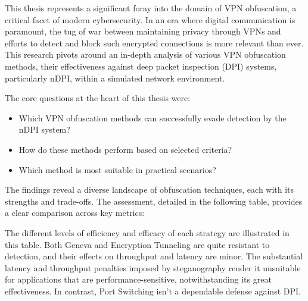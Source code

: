 \documentclass[12pt, fleqn, a4paper]{article}
\begin{document}
This thesis represents a significant foray into the domain of VPN obfuscation, a critical facet of modern cybersecurity. In an era where digital communication is paramount, the tug of war between maintaining privacy through VPNs and efforts to detect and block such encrypted connections is more relevant than ever. This research pivots around an in-depth analysis of various VPN obfuscation methods, their effectiveness against deep packet inspection (DPI) systems, particularly nDPI, within a simulated network environment.

The core questions at the heart of this thesis were:
\begin{itemize}
  \item Which VPN obfuscation methods can successfully evade detection by the nDPI system?
  \item How do these methods perform based on selected criteria?
  \item Which method is most suitable in practical scenarios?
\end{itemize}

The findings reveal a diverse landscape of obfuscation techniques, each with its strengths and trade-offs. The assessment, detailed in the following table, provides a clear comparison across key metrics:

\begin{table}[h]
\centering
\caption{Comparison of VPN Obfuscation Methods}
\label{table:vpn_obfuscation_methods}
\end{table}

The different levels of efficiency and efficacy of each strategy are illustrated in this table. Both Geneva and Encryption Tunneling are quite resistant to detection, and their effects on throughput and latency are minor. The substantial latency and throughput penalties imposed by steganography render it unsuitable for applications that are performance-sensitive, notwithstanding its great effectiveness. In contrast, Port Switching isn't a dependable defense against DPI.
\end{document}
